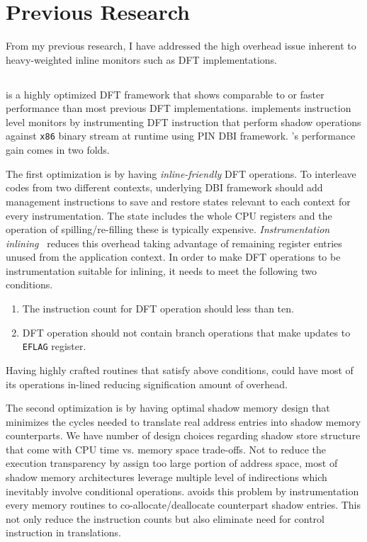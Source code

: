 \section{Previous Research}
\label{sec:previous}

From my previous research, I have addressed the high overhead issue inherent to
heavy-weighted inline monitors such as DFT implementations.

\subsection{\libdft}

\libdft is a highly optimized DFT framework that shows comparable to or faster
performance than most previous DFT implementations. \libdft implements
instruction level monitors by instrumenting DFT instruction that perform shadow
operations against {\tt x86} binary stream at runtime using PIN DBI
framework.
%
\libdft's performance gain comes in two folds. 

The first optimization is by having {\it inline-friendly} DFT operations. To
interleave codes from two different contexts, underlying DBI framework should
add management instructions to save and restore states relevant to each context
for every instrumentation. The state includes the whole CPU registers and the
operation of spilling/re-filling these is typically expensive. {\it
Instrumentation inlining}~\cite{inlining:wbia2006} reduces this overhead taking
advantage of remaining register entries unused from the application context. In
order to make DFT operations to be instrumentation suitable for inlining, it
needs to meet the following two conditions.
%
\begin{enumerate} \item The instruction count for DFT operation should less
than ten.  \item DFT operation should not contain branch operations that make
updates to {\tt EFLAG} register.  \end{enumerate} 
%
Having highly crafted routines that satisfy above conditions, \libdft could
have most of its operations in-lined reducing signification amount of overhead.

The second optimization is by having optimal shadow memory design that
minimizes the cycles needed to translate real address entries into shadow
memory counterparts. We have number of design choices regarding shadow store
structure that come with CPU time vs. memory space trade-offs. Not to reduce
the execution transparency by assign too large portion of address space, most
of shadow memory architectures leverage multiple level of indirections which
inevitably involve conditional operations. \libdft avoids this problem by
instrumentation every memory routines to co-allocate/deallocate counterpart
shadow entries. This not only reduce the instruction counts but also eliminate
need for control instruction in translations.

